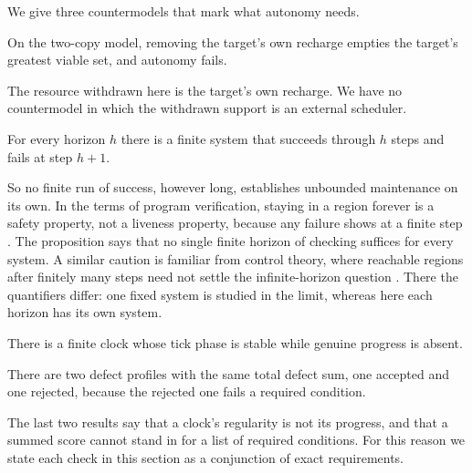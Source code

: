 We give three countermodels that mark what autonomy needs.

\begin{proposition}
\label{prop:resource}
On the two-copy model, removing the target's own recharge empties the target's
greatest viable set, and autonomy fails.
\end{proposition}

The resource withdrawn here is the target's own recharge. We have no
countermodel in which the withdrawn support is an external scheduler.

\begin{proposition}
\label{prop:countdown}
For every horizon $h$ there is a finite system that succeeds through $h$
steps and fails at step $h+1$.
\end{proposition}

So no finite run of success, however long, establishes unbounded maintenance
on its own. In the terms of program verification, staying in a region forever
is a safety property, not a liveness property, because any failure shows at a
finite step \citep{AlpernSchneider1985}. The proposition says that no single
finite horizon of checking suffices for every system. A similar caution is familiar from control theory, where reachable
regions after finitely many steps need not settle the infinite-horizon question
\citep{Bertsekas1972}. There the quantifiers differ: one fixed system is
studied in the limit, whereas here each horizon has its own system.

\begin{proposition}
\label{prop:stall}
There is a finite clock whose tick phase is stable while genuine progress is
absent.
\end{proposition}

\begin{proposition}
\label{prop:scalar}
There are two defect profiles with the same total defect sum, one accepted
and one rejected, because the rejected one fails a required condition.
\end{proposition}

The last two results say that a clock's regularity is not its progress, and
that a summed score cannot stand in for a list of required conditions. For this reason we state each check in this section as a conjunction of exact
requirements.
